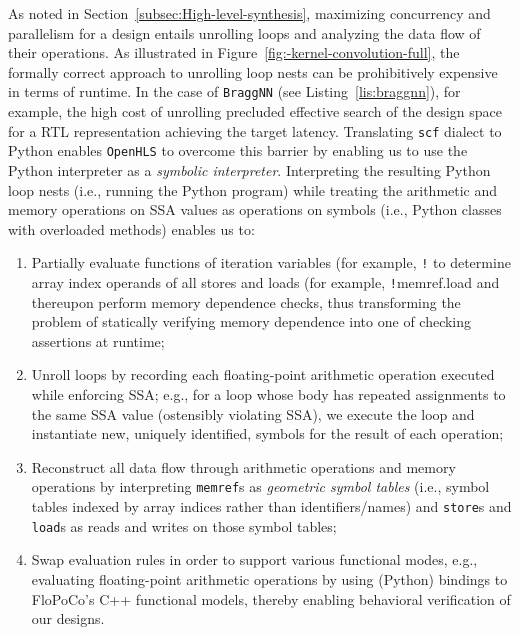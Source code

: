 \documentclass[10pt]{sig-alternate}
\begin{document}
As noted in Section~\ref{subsec:High-level-synthesis}, maximizing
concurrency and parallelism for a design entails unrolling loops
and analyzing the data flow of their operations. As illustrated in Figure~\ref{fig:-kernel-convolution-full}, the formally correct approach to unrolling loop nests can be prohibitively expensive in terms of runtime. In the
case of \texttt{BraggNN} (see Listing~\ref{lis:braggnn}), for example, the high cost of unrolling precluded effective search of the design space for a RTL representation
achieving the target latency.
Translating \texttt{scf} dialect to Python enables \texttt{OpenHLS}
to overcome this barrier by enabling us to use the Python interpreter
as a \emph{symbolic interpreter}. Interpreting the resulting Python
loop nests (i.e., running the Python program) while treating the arithmetic
and memory operations on SSA values as operations on symbols (i.e.,
Python classes with overloaded methods) enables us to:
\begin{enumerate}
\item Partially evaluate functions of iteration variables (for example,  \texttt!%
to determine array index operands of all stores
and loads (for example, \linebreak \texttt!memref.load %
and thereupon \linebreak perform memory dependence checks, thus transforming
the problem of statically verifying memory dependence into one
of checking assertions at runtime;
\item Unroll loops by recording each floating-point arithmetic operation
executed while enforcing SSA; e.g., for a loop whose body has repeated
assignments to the same SSA value (ostensibly violating SSA), we execute
the loop and instantiate new, uniquely identified, symbols for the
result of each operation;
\item Reconstruct all data flow through arithmetic operations and memory
operations by interpreting \texttt{memref}s as \emph{geometric symbol
tables} (i.e., symbol tables indexed by array indices rather than
identifiers/names) and \texttt{store}s and \texttt{load}s as reads
and writes on those symbol tables;
\item Swap evaluation rules in order to support various functional
modes, e.g., evaluating floating-point arithmetic operations by using
(Python) bindings to FloPoCo's C++ functional models, thereby enabling
behavioral verification of our designs.
\end{enumerate}
\end{document}
